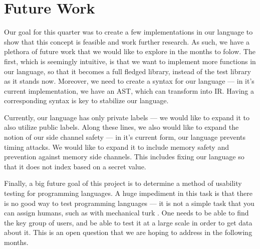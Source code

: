 \section{Future Work}
\label{sec:future}

Our goal for this quarter was to create a few implementations in our language to
show that this concept is feasible and work further research. As such, we have a
plethora of future work that we would like to explore in the months to folow.
The first, which is seemingly intuitive, is that we want to implement more
functions in our language, so that it becomes a full fledged library, instead of
the test library as it stands now. Moreover, we need to create a syntax for our
language --- in it's current implementation, we have an AST, which can transform
into IR. Having a corresponding syntax is key to stabilize our language.

Currently, our language has only private labels --- we would like to expand it
to also utilize public labels. Along these lines, we also would like to expand
the notion of our side channel safety --- in it's current form, our language
prevents timing attacks. We would like to expand it to include memory safety and
prevention against memory side channels. This includes fixing our language so
that it does not index based on a secret value. 

Finally, a big future goal of this project is to determine a method of usability
testing for programming languages. A huge impediment in this task is that there
is no good way to test programming languages --- it is not a simple task that
you can assign humans, such as with mechanical turk . One needs to
be able to find the key group of users, and be able to test it at a large scale
in order to get data about it. This is an open question that we are hoping to
address in the following months.
